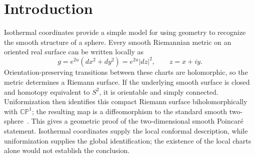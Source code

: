 \documentclass[11pt]{article}
\numberwithin{equation}{section}
\theoremstyle{definition}
\theoremstyle{remark}
\newcommand{\CP}{\mathbb{CP}}
\begin{document}
\begin{abstract}
Within one fixed round value basin, the initial live Lorentz
$L^{4,1}$ strain controls the whole-time strain integral and
quantitative distance to one joint round pullback. Multiscale
examples show that higher Lorentz indices do not give the
corresponding uniform linear bound, even among smooth global
flows close in initial connection and curvature values.
The reconstructed transverse-traceless linearization is four
times normalized Ricci flow; the fourth-order gradient of the
pulled-back metric energy is a distinct evolution. These
flow results concern the stated classes of existing definite data.
They supply neither qualifying initial connections on arbitrary
smooth homotopy four-spheres nor general a priori bounds for
their evolution.
\end{abstract}
\begingroup
\small
\tableofcontents
\endgroup
\newpage



\section{Introduction}\label{sec:introduction}

Isothermal coordinates provide a simple model for using geometry to
recognize the smooth structure of a sphere. Every smooth Riemannian metric
on an oriented real surface can be written locally as
\[
 g=e^{2u}(dx^2+dy^2)=e^{2u}|dz|^2,\qquad z=x+iy.
\]
Orientation-preserving transitions between these charts are holomorphic,
so the metric determines a Riemann surface. If the underlying smooth
surface is closed and homotopy equivalent to \(S^2\), it is orientable
and simply connected. Uniformization then identifies this compact Riemann
surface biholomorphically with \(\CP^1\); the resulting map is a
diffeomorphism to the standard smooth two-sphere~\cite{Donaldson2011}.
This gives a geometric proof of the two-dimensional smooth Poincar\'e
statement. Isothermal coordinates supply the local conformal description,
while uniformization supplies the global identification; the existence of
the local charts alone would not establish the conclusion.
\end{document}
